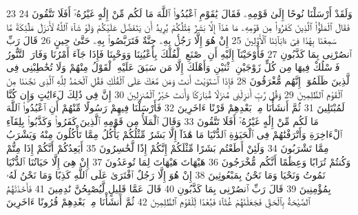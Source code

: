 {\tiny\colorbox{cl_aya}{23}} وَلَقَدْ أَرْسَلْنَا نُوحًا إِلَىٰ قَوْمِهِۦ فَقَالَ يَٰقَوْمِ ٱعْبُدُوا۟ ٱللَّهَ مَا لَكُم مِّنْ إِلَٰهٍ غَيْرُهُۥٓ أَفَلَا تَتَّقُونَ
{\tiny\colorbox{cl_aya}{24}} فَقَالَ ٱلْمَلَؤُا۟ ٱلَّذِينَ كَفَرُوا۟ مِن قَوْمِهِۦ مَا هَٰذَآ إِلَّا بَشَرٌ مِّثْلُكُمْ يُرِيدُ أَن يَتَفَضَّلَ عَلَيْكُمْ وَلَوْ شَآءَ ٱللَّهُ لَأَنزَلَ مَلَٰٓئِكَةً مَّا سَمِعْنَا بِهَٰذَا فِىٓ ءَابَآئِنَا ٱلْأَوَّلِينَ
{\tiny\colorbox{cl_aya}{25}} إِنْ هُوَ إِلَّا رَجُلٌۢ بِهِۦ جِنَّةٌ فَتَرَبَّصُوا۟ بِهِۦ حَتَّىٰ حِينٍ
{\tiny\colorbox{cl_aya}{26}} قَالَ رَبِّ ٱنصُرْنِى بِمَا كَذَّبُونِ
{\tiny\colorbox{cl_aya}{27}} فَأَوْحَيْنَآ إِلَيْهِ أَنِ ٱصْنَعِ ٱلْفُلْكَ بِأَعْيُنِنَا وَوَحْيِنَا فَإِذَا جَآءَ أَمْرُنَا وَفَارَ ٱلتَّنُّورُ فَٱسْلُكْ فِيهَا مِن كُلٍّ زَوْجَيْنِ ٱثْنَيْنِ وَأَهْلَكَ إِلَّا مَن سَبَقَ عَلَيْهِ ٱلْقَوْلُ مِنْهُمْ وَلَا تُخَٰطِبْنِى فِى ٱلَّذِينَ ظَلَمُوٓا۟ إِنَّهُم مُّغْرَقُونَ
{\tiny\colorbox{cl_aya}{28}} فَإِذَا ٱسْتَوَيْتَ أَنتَ وَمَن مَّعَكَ عَلَى ٱلْفُلْكِ فَقُلِ ٱلْحَمْدُ لِلَّهِ ٱلَّذِى نَجَّىٰنَا مِنَ ٱلْقَوْمِ ٱلظَّٰلِمِينَ
{\tiny\colorbox{cl_aya}{29}} وَقُل رَّبِّ أَنزِلْنِى مُنزَلًا مُّبَارَكًا وَأَنتَ خَيْرُ ٱلْمُنزِلِينَ
{\tiny\colorbox{cl_aya}{30}} إِنَّ فِى ذَٰلِكَ لَءَايَٰتٍ وَإِن كُنَّا لَمُبْتَلِينَ
{\tiny\colorbox{cl_aya}{31}} ثُمَّ أَنشَأْنَا مِنۢ بَعْدِهِمْ قَرْنًا ءَاخَرِينَ
{\tiny\colorbox{cl_aya}{32}} فَأَرْسَلْنَا فِيهِمْ رَسُولًا مِّنْهُمْ أَنِ ٱعْبُدُوا۟ ٱللَّهَ مَا لَكُم مِّنْ إِلَٰهٍ غَيْرُهُۥٓ أَفَلَا تَتَّقُونَ
{\tiny\colorbox{cl_aya}{33}} وَقَالَ ٱلْمَلَأُ مِن قَوْمِهِ ٱلَّذِينَ كَفَرُوا۟ وَكَذَّبُوا۟ بِلِقَآءِ ٱلْءَاخِرَةِ وَأَتْرَفْنَٰهُمْ فِى ٱلْحَيَوٰةِ ٱلدُّنْيَا مَا هَٰذَآ إِلَّا بَشَرٌ مِّثْلُكُمْ يَأْكُلُ مِمَّا تَأْكُلُونَ مِنْهُ وَيَشْرَبُ مِمَّا تَشْرَبُونَ
{\tiny\colorbox{cl_aya}{34}} وَلَئِنْ أَطَعْتُم بَشَرًا مِّثْلَكُمْ إِنَّكُمْ إِذًا لَّخَٰسِرُونَ
{\tiny\colorbox{cl_aya}{35}} أَيَعِدُكُمْ أَنَّكُمْ إِذَا مِتُّمْ وَكُنتُمْ تُرَابًا وَعِظَٰمًا أَنَّكُم مُّخْرَجُونَ
{\tiny\colorbox{cl_aya}{36}} هَيْهَاتَ هَيْهَاتَ لِمَا تُوعَدُونَ
{\tiny\colorbox{cl_aya}{37}} إِنْ هِىَ إِلَّا حَيَاتُنَا ٱلدُّنْيَا نَمُوتُ وَنَحْيَا وَمَا نَحْنُ بِمَبْعُوثِينَ
{\tiny\colorbox{cl_aya}{38}} إِنْ هُوَ إِلَّا رَجُلٌ ٱفْتَرَىٰ عَلَى ٱللَّهِ كَذِبًا وَمَا نَحْنُ لَهُۥ بِمُؤْمِنِينَ
{\tiny\colorbox{cl_aya}{39}} قَالَ رَبِّ ٱنصُرْنِى بِمَا كَذَّبُونِ
{\tiny\colorbox{cl_aya}{40}} قَالَ عَمَّا قَلِيلٍ لَّيُصْبِحُنَّ نَٰدِمِينَ
{\tiny\colorbox{cl_aya}{41}} فَأَخَذَتْهُمُ ٱلصَّيْحَةُ بِٱلْحَقِّ فَجَعَلْنَٰهُمْ غُثَآءً فَبُعْدًا لِّلْقَوْمِ ٱلظَّٰلِمِينَ
{\tiny\colorbox{cl_aya}{42}} ثُمَّ أَنشَأْنَا مِنۢ بَعْدِهِمْ قُرُونًا ءَاخَرِينَ
